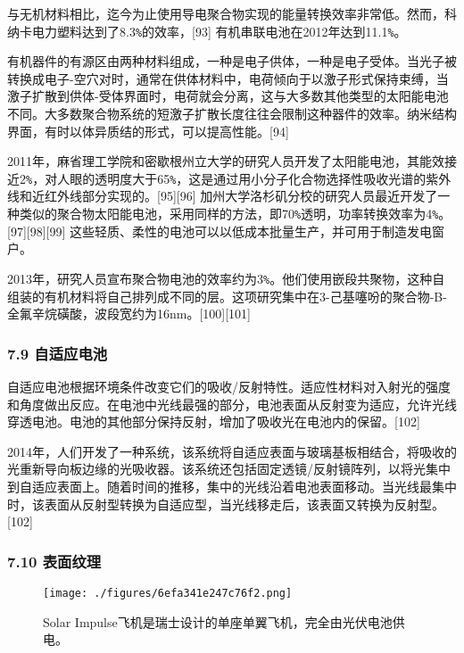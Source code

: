 与无机材料相比，迄今为止使用导电聚合物实现的能量转换效率非常低。然而，科纳卡电力塑料达到了8.3\verb|%|的效率，[93] 有机串联电池在2012年达到11.1\verb|%|。

有机器件的有源区由两种材料组成，一种是电子供体，一种是电子受体。当光子被转换成电子-空穴对时，通常在供体材料中，电荷倾向于以激子形式保持束缚，当激子扩散到供体-受体界面时，电荷就会分离，这与大多数其他类型的太阳能电池不同。大多数聚合物系统的短激子扩散长度往往会限制这种器件的效率。纳米结构界面，有时以体异质结的形式，可以提高性能。[94]

2011年，麻省理工学院和密歇根州立大学的研究人员开发了太阳能电池，其能效接近2\verb|%|，对人眼的透明度大于65\verb|%|，这是通过用小分子化合物选择性吸收光谱的紫外线和近红外线部分实现的。[95][96] 加州大学洛杉矶分校的研究人员最近开发了一种类似的聚合物太阳能电池，采用同样的方法，即70\verb|%|透明，功率转换效率为4\verb|%|。[97][98][99] 这些轻质、柔性的电池可以以低成本批量生产，并可用于制造发电窗户。

2013年，研究人员宣布聚合物电池的效率约为3\verb|%|。他们使用嵌段共聚物，这种自组装的有机材料将自己排列成不同的层。这项研究集中在3-己基噻吩的聚合物-B-全氟辛烷磺酸，波段宽约为16nm。[100][101]

\subsubsection{7.9 自适应电池}

自适应电池根据环境条件改变它们的吸收/反射特性。适应性材料对入射光的强度和角度做出反应。在电池中光线最强的部分，电池表面从反射变为适应，允许光线穿透电池。电池的其他部分保持反射，增加了吸收光在电池内的保留。[102]

2014年，人们开发了一种系统，该系统将自适应表面与玻璃基板相结合，将吸收的光重新导向板边缘的光吸收器。该系统还包括固定透镜/反射镜阵列，以将光集中到自适应表面上。随着时间的推移，集中的光线沿着电池表面移动。当光线最集中时，该表面从反射型转换为自适应型，当光线移走后，该表面又转换为反射型。[102]

\subsubsection{7.10 表面纹理}

\begin{figure}[ht]
\centering
\texttt{[image: ./figures/6efa341e247c76f2.png]}
\caption{Solar Impulse飞机是瑞士设计的单座单翼飞机，完全由光伏电池供电。} \label{fig_TYNDC_4}
\end{figure}

